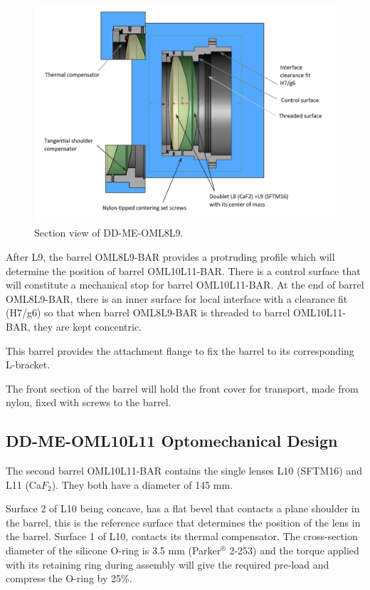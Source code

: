 \documentclass{report}
\begin{document}
\begin{figure}
\begin{center}
\includegraphics[width=0.9\linewidth]{figures/DD-OML8L9_secview.png}
\end{center}
\caption{Section view of DD-ME-OML8L9.}
\label{figure:WOB-L8L9-SV}
\end{figure}


After L9, the barrel OML8L9-BAR provides a protruding profile which will determine the position of barrel OML10L11-BAR. There is a control surface that will constitute a mechanical stop for barrel OML10L11-BAR. At the end of barrel OML8L9-BAR, there is an inner surface for local interface with a clearance fit (H7/g6) so that when barrel OML8L9-BAR is threaded to barrel OML10L11-BAR, they are kept concentric. 

This barrel provides the attachment flange to fix the barrel to its corresponding L-bracket.

The front section of the barrel will hold the front cover for transport, made from nylon, fixed with screws to the barrel.

\subsection{DD-ME-OML10L11 Optomechanical Design}

The second barrel OML10L11-BAR contains the single lenses L10 (SFTM16) and L11 (Ca$F_2$). They both have a diameter of 145 mm.

Surface 2 of L10 being concave, has a flat bevel that contacts a plane shoulder in the barrel, this is the reference surface that determines the position of the lens in the barrel. Surface 1 of L10, contacts its thermal compensator. The cross-section diameter of the silicone O-ring is 3.5 mm (Parker${}^\circledR$ 2-253) and the torque applied with its retaining ring during assembly will give the required pre-load and compress the O-ring by 25\%.
\end{document}
